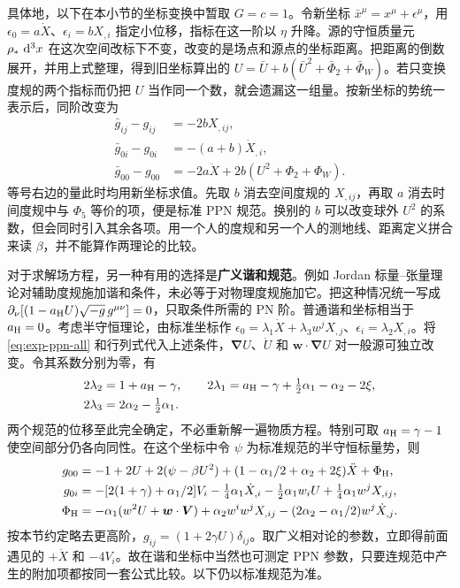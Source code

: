 具体地，以下在本小节的坐标变换中暂取 $G=c=1$。令新坐标 $\bar x^\mu=x^\mu+\epsilon^\mu$，用 $\epsilon_0=a\dot X$、$\epsilon_i=b X_{,i}$ 指定小位移，指标在这一阶以 $\eta$ 升降。源的守恒质量元 $\rho_*\,\dd[3]{x}$ 在这次空间改标下不变，改变的是场点和源点的坐标距离。把距离的倒数展开，并用上式整理，得到旧坐标算出的 $U=\bar U+b(\bar U^2+\bar\Phi_2+\bar\Phi_W)$。若只变换度规的两个指标而仍把 $U$ 当作同一个数，就会遗漏这一组量。按新坐标的势统一表示后，同阶改变为
\begin{align*}
 \bar g_{ij}-g_{ij}&=-2bX_{,ij},\\
 \bar g_{0i}-g_{0i}&=-(a+b)\dot X_{,i},\\
 \bar g_{00}-g_{00}&=-2a\ddot X+2b(U^2+\Phi_2+\Phi_W).
\end{align*}
等号右边的量此时均用新坐标求值。先取 $b$ 消去空间度规的 $X_{,ij}$，再取 $a$ 消去时间度规中与 $\Phi_5$ 等价的项，便是标准 PPN 规范。换别的 $b$ 可以改变球外 $U^2$ 的系数，但会同时引入其余各项。用一个人的度规和另一个人的测地线、距离定义拼合来读 $\beta$，并不能算作两理论的比较。

对于求解场方程，另一种有用的选择是\textbf{广义谐和规范}。例如 Jordan 标量--张量理论对辅助度规施加谐和条件，未必等于对物理度规施加它。把这种情况统一写成 $\partial_\nu[(1-a_{\rm H}U)\sqrt{-g}\,g^{\mu\nu}]=0$，只取条件所需的 PN 阶。普通谐和坐标相当于 $a_{\rm H}=0$。考虑半守恒理论，由标准坐标作 $\epsilon_0=\lambda_1\dot X+\lambda_3w^jX_{,j}$、$\epsilon_i=\lambda_2X_{,i}$。将 \eqref{eq:exp-ppn-all} 和行列式代入上述条件，$\bm\nabla U$、$\dot U$ 和 $\bm w\cdot\bm\nabla U$ 对一般源可独立改变。令其系数分别为零，有
\begin{align*}
 2\lambda_2&=1+a_{\rm H}-\gamma,\qquad
 2\lambda_1=a_{\rm H}-\gamma+\tfrac12\alpha_1-\alpha_2-2\xi,\\
 2\lambda_3&=2\alpha_2-\tfrac12\alpha_1 .
\end{align*}
两个规范的位移至此完全确定，不必重新解一遍物质方程。特别可取 $a_{\rm H}=\gamma-1$ 使空间部分仍各向同性。在这个坐标中令 $\psi$ 为标准规范的半守恒标量势，则
\begin{align*}
 g_{00}&=-1+2U+2(\psi-\beta U^2)
       +(1-\alpha_1/2+\alpha_2+2\xi)\ddot X+\Phi_{\rm H},\\
 g_{0i}&=-[2(1+\gamma)+\alpha_1/2]V_i-\tfrac14\alpha_1\dot X_{,i}
          -\tfrac12\alpha_1 w_i U+\tfrac14\alpha_1w^jX_{,ij},\\
 \Phi_{\rm H}&=-\alpha_1(w^2U+\bm w\cdot\bm V)+\alpha_2w^iw^jX_{,ij}
                   -(2\alpha_2-\alpha_1/2)w^j\dot X_{,j}.
\end{align*}
按本节约定略去更高阶，$g_{ij}=(1+2\gamma U)\delta_{ij}$。取广义相对论的参数，立即得前面遇见的 $+\ddot X$ 和 $-4V_i$。故在谐和坐标中当然也可测定 PPN 参数，只要连规范中产生的附加项都按同一套公式比较。以下仍以标准规范为准。

